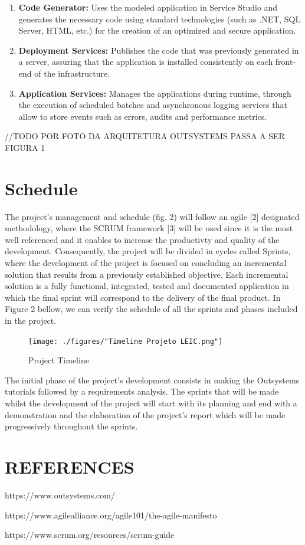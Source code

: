 \documentclass[a4paper,openright,12pt]{report}
\begin{document}
\begin{enumerate}
\item \textbf{Code Generator:} Uses the modeled application in Service Studio and generates the necessary code using standard technologies (such as .NET, SQL Server, HTML, etc.) for the creation of an optimized and secure application.
\item \textbf{ Deployment Services:} Publishes the code that was previously generated in a server, assuring that the application is installed consistently on each front-end of the infrastructure.
\item  \textbf{Application Services:} Manages the applications during runtime, through the execution of scheduled batches and asynchronous logging services that allow to store events such as errors, audits and performance metrics.
\end{enumerate}

//TODO POR FOTO DA ARQUITETURA OUTSYSTEMS PASSA A SER FIGURA 1

\section*{Schedule} 

The project's management and schedule (fig. 2) will follow an agile [2] designated methodology, where the SCRUM framework [3] will be used since it is the most well referenced and it enables to increase the productivty and quality of the development. Consequently, the project will be divided in cycles called Sprints, where the development of the project is focused on concluding an incremental solution that results from a previously established objective. Each incremental solution  is a fully functional, integrated, tested and documented application in which the final sprint will correspond to the delivery of the final product. In Figure 2 bellow, we can verify the schedule of all the sprints and phases included in the project.

\begin{figure}[h]
  \texttt{[image: ./figures/"Timeline Projeto LEIC.png"]}
  \caption{Project Timeline}
  \label{fig:schedule}
\end{figure}

The initial phase of the project's development consists in making the Outsystems tutorials followed by a requirements analysis. The sprints that will be made whilst the development of the project will start with its planning and end with a demonstration and the elaboration of the project's report which will be made progressively throughout the sprints.

\section*{REFERENCES}

\par
[1] https://www.outsystems.com/ \par
[2] https://www.agilealliance.org/agile101/the-agile-manifesto \par
[3] https://www.scrum.org/resources/scrum-guide
\end{document}
